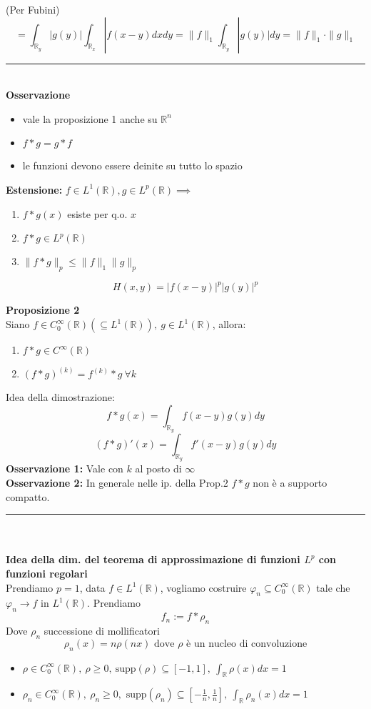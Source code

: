 \documentclass[a4paper]{article}
\newcommand{\R}{\mathbb{R}}
\newcommand{\divider}{\noindent\rule{\textwidth}{0.5pt}}
\begin{document}
(Per Fubini)
\[=\int_{\R_y}^{} |g(y)| \int_{\R_x}^{} |f(x-y)dxdy=\|f\|_1 \int_{\R_y}^{} |g(y)|dy=\|f\|_1\cdot \|g\|_1\]   
\divider\\
\textbf{Osservazione}
\begin{itemize}
	\item vale la proposizione 1 anche su $\R^n$ 
	\item $f* g=g * f$ 
	\item le funzioni devono essere deinite su tutto lo spazio
\end{itemize}
\textbf{Estensione:} $f\in L^{1}(\R),g\in L^{p}(\R)\implies$
\begin{enumerate}
	\item $f * g(x)$ esiste per q.o. $x$ 
	\item $f*g\in L^{p}(\R)$ 
	\item $\|f * g\|_p\le \|f\|_1 \|g\|_p$
\end{enumerate}
\[H(x,y)=|f(x-y)|^p|g(y)|^p\]
\begin{tcolorbox}
	\textbf{Proposizione 2} 
	\\Siano $f\in C_0^\infty(\R)(\subseteq  L^{1}(\R)),\ g\in L^{1}(\R)$, allora:
	\begin{enumerate}
		\item $f*g\in C^\infty(\R)$ 
		\item $(f*g)^{(k)}=f^{(k)}*g\ \forall k$
	\end{enumerate}
\end{tcolorbox}
Idea della dimostrazione: 
\[f * g(x)=\int_{\R_y}^{} f(x-y)g(y)dy\]
\[(f *g)'(x)=\int_{\R_y}^{} f'(x-y)g(y)dy\]
\textbf{Osservazione 1:} 
Vale con $k$ al posto di $\infty$\\
\textbf{Osservazione 2:} In generale nelle ip. della Prop.2 $f*g$ non è a supporto compatto. 
\\\divider\\
\\\textbf{Idea della dim. del teorema di approssimazione di funzioni $L ^p$ con funzioni regolari}
\\Prendiamo $p=1$, data $f\in L^{1}(\R)$, vogliamo costruire $\varphi_n\subseteq  C_0^\infty(\R)$ tale che $\varphi_n\to f$ in $L^{1}(\R)$. Prendiamo
\[f_n:=f*\rho_n\]
Dove $\rho_n$ successione di mollificatori
\[\rho_n(x)=n\rho(nx) \text{ dove }\rho \text{ è un nucleo di convoluzione}\]
\begin{itemize}
	\item $\rho\in C_0^\infty(\R),\ \rho\ge 0,\ \text{supp}(\rho)\subseteq  [-1,1],\ \int_{\R}^{} \rho(x)dx=1$ 
	\item $\rho_n\in C^\infty_0(\R),\ \rho_n\ge 0,\text{ supp}(\rho_n)\subseteq [-\frac{1}{n},\frac{1}{n}],\ \int_{\R}^{} \rho_n(x)dx=1 $
\end{itemize}
\end{document}
